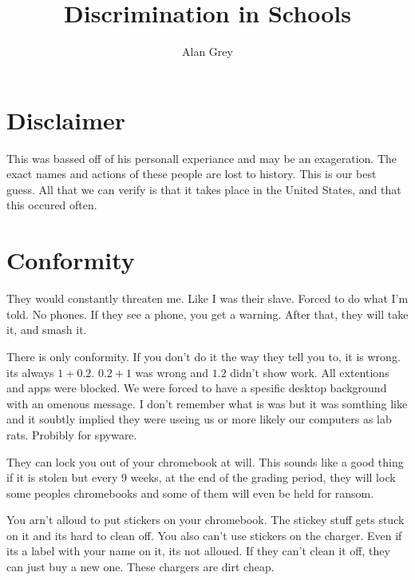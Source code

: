 \usepackage[utf-8]{inputenc}
\usepackage[english]{babel}
\usepackage[letterpaper]{geometry}
\usepackage{fancyhdr}
\usepackage{amsfonts}
\usepackage{amssymb}
\usepackage{xcolor}
\usepackage{dirtytalk}
\rfoot{\thepage}
\title{Discrimination in Schools}
\author{Alan Grey}
\date{}
\pagestyle{fancy}

\maketitle
\thispagestyle{fancy}

\section{Disclaimer}
This was bassed off of his personall experiance
and may be an exageration. The exact names and 
actions of these people are lost to history.
This is our best guess. All that we can verify
is that it takes place in the United States,
and that this occured often.

\section{Conformity}
They would constantly threaten me. Like I was
their slave. Forced to do what I'm told. No
phones. If they see a phone, you get a warning.
After that, they will take it, and smash it.

There is only conformity. If you don't do it
the way they tell you to, it is wrong. its
always $1+0.2$. $0.2+1$ was wrong and $1.2$ 
didn't show work. All extentions and apps
were blocked. We were forced to have a
spesific desktop background with an omenous
message. I don't remember what is was but
it was somthing like 
and it soubtly implied they were useing us
or more likely our computers as lab rats.
Probibly for spyware. 

They can lock you out of your chromebook
at will. This sounds like a good thing
if it is stolen but every 9 weeks, at the
end of the grading period, they will lock
some peoples chromebooks and some of them
will even be held for ransom. 

You arn't alloud to put stickers on your
chromebook. The stickey stuff gets stuck
on it and its hard to clean off. You
also can't use stickers on the charger. 
Even if its a label with your name on it,
its not alloued. If they can't clean it off,
they can just buy a new one. These chargers
are dirt cheap. 

